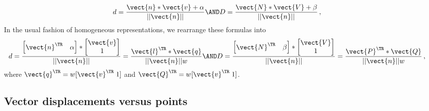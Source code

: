 \documentclass[oneandhalfcolumn]{coursenotes-handout}
\begin{document}
\begin{exercise}
\begin{align}
    d = \frac{\vect{n} * \vect{v} + \alpha}{||\vect{n}||} \AND
    D = \frac{\vect{N} * \vect{V} + \beta}{||\vect{n}||} \,,
  \end{align}
  In the usual fashion of homogeneous representations, we rearrange these formulas into
  \begin{align}
    d = \frac{\begin{bmatrix}\vect{n}^{\TR} & \alpha\end{bmatrix} * \begin{bmatrix}\vect{v} \\ 1\end{bmatrix}}{||\vect{n}||} = \frac{\vect{l}^{\TR} * \vect{q}}{||\vect{n}||w} \AND
    D = \frac{\begin{bmatrix}\vect{N}^{\TR} & \beta\end{bmatrix} * \begin{bmatrix}\vect{V} \\ 1\end{bmatrix}}{||\vect{n}||} = \frac{\vect{P}^{\TR} * \vect{Q}}{||\vect{n}||w} \,,
  \end{align}
  where \(\vect{q}^{\TR} = w [\vect{v}^{\TR} \; 1]\) and \(\vect{Q}^{\TR} = w [\vect{v}^{\TR} \; 1]\).
\end{exercise}

\subsection{Vector displacements versus points}\label{sec:homogeneous-coords-vector-displacements}
\end{document}
